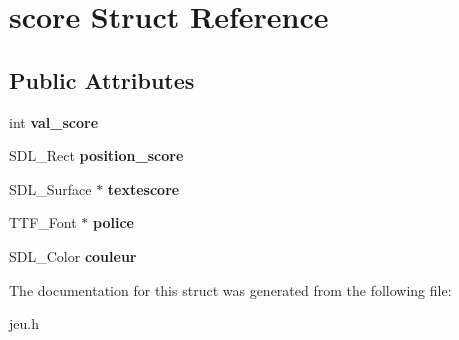 \hypertarget{structscore}{}\section{score Struct Reference}
\label{structscore}
\subsection*{Public Attributes}
\begin{DoxyCompactItemize}
\item 
\mbox{\label{structscore_a5343f5817f1c68a2c5fcb72cefb1a9d8}} 
int {\bfseries val\+\_\+score}
\item 
\mbox{\label{structscore_a444e826e64d1abf14dc0108095752cc1}} 
S\+D\+L\+\_\+\+Rect {\bfseries position\+\_\+score}
\item 
\mbox{\label{structscore_ae31d012e7e39d62d8f7057dd45369c13}} 
S\+D\+L\+\_\+\+Surface $\ast$ {\bfseries textescore}
\item 
\mbox{\label{structscore_ad67d6e549ef8a3acb864764a6378f7d8}} 
T\+T\+F\+\_\+\+Font $\ast$ {\bfseries police}
\item 
\mbox{\label{structscore_afd601c00b6354d7a6cacb78bfd8ec32a}} 
S\+D\+L\+\_\+\+Color {\bfseries couleur}
\end{DoxyCompactItemize}


The documentation for this struct was generated from the following file\+:\begin{DoxyCompactItemize}
\item 
jeu.\+h\end{DoxyCompactItemize}
